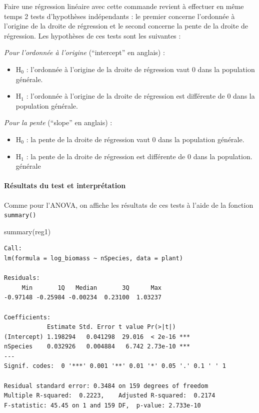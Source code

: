 \documentclass[
  a4paper,
]{article}
\newenvironment{Shaded}{\begin{snugshade}}{\end{snugshade}}
\newcommand{\FunctionTok}[1]{\textcolor[rgb]{0.39,0.29,0.61}{#1}}
\newcommand{\NormalTok}[1]{\textcolor[rgb]{0.12,0.11,0.11}{#1}}
\providecommand{\tightlist}{%
  \setlength{\itemsep}{0pt}\setlength{\parskip}{0pt}}
\begin{document}
Faire une régression linéaire avec cette commande revient à effectuer en même temps 2 tests d'hypothèses indépendants : le premier concerne l'ordonnée à l'origine de la droite de régression et le second concerne la pente de la droite de régression. Les hypothèses de ces tests sont les suivantes :

\emph{Pour l'ordonnée à l'origine} (``intercept'' en anglais) :

\begin{itemize}
\tightlist
\item
  H\(_0\) : l'ordonnée à l'origine de la droite de régression vaut 0 dans la population générale.
\item
  H\(_1\) : l'ordonnée à l'origine de la droite de régression est différente de 0 dans la population générale.
\end{itemize}

\emph{Pour la pente} (``slope'' en anglais) :

\begin{itemize}
\tightlist
\item
  H\(_0\) : la pente de la droite de régression vaut 0 dans la population générale.
\item
  H\(_1\) : la pente de la droite de régression est différente de 0 dans la population. générale
\end{itemize}

\hypertarget{ruxe9sultats-du-test-et-interpruxe9tation-1}{%
\paragraph{Résultats du test et interprétation}\label{ruxe9sultats-du-test-et-interpruxe9tation-1}}

Comme pour l'ANOVA, on affiche les résultats de ces tests à l'aide de la fonction \texttt{summary()}

\begin{Shaded}
\begin{Highlighting}[]
\FunctionTok{summary}\NormalTok{(reg1)}
\end{Highlighting}
\end{Shaded}

\begin{verbatim}
Call:
lm(formula = log_biomass ~ nSpecies, data = plant)

Residuals:
     Min       1Q   Median       3Q      Max 
-0.97148 -0.25984 -0.00234  0.23100  1.03237 

Coefficients:
            Estimate Std. Error t value Pr(>|t|)    
(Intercept) 1.198294   0.041298  29.016  < 2e-16 ***
nSpecies    0.032926   0.004884   6.742 2.73e-10 ***
---
Signif. codes:  0 '***' 0.001 '**' 0.01 '*' 0.05 '.' 0.1 ' ' 1

Residual standard error: 0.3484 on 159 degrees of freedom
Multiple R-squared:  0.2223,    Adjusted R-squared:  0.2174 
F-statistic: 45.45 on 1 and 159 DF,  p-value: 2.733e-10
\end{verbatim}
\end{document}
